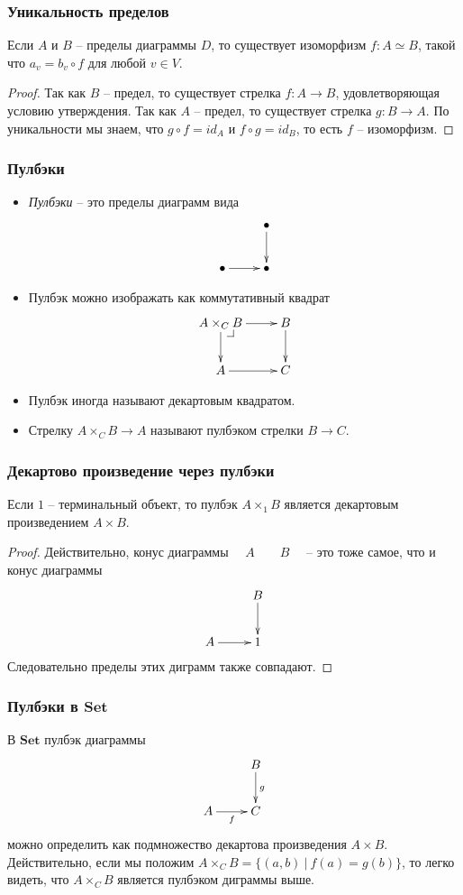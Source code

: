 \documentclass{beamer}
\makeatletter
\theoremstyle{definition}
\newcommand{\cat}[1]{\mathbf{#1}}
\newcommand{\Set}{\cat{Set}}
\newcommand{\pb}[1][dr]{\save*!/#1-1.2pc/#1:(-1,1)@^{|-}\restore}
\makeatother
\begin{document}
\begin{frame}
\frametitle{Уникальность пределов}
\begin{prop}
Если $A$ и $B$ -- пределы диаграммы $D$, то существует изоморфизм $f : A \simeq B$, такой что $a_v = b_v \circ f$ для любой $v \in V$.
\end{prop}
\begin{proof}
Так как $B$ -- предел, то существует стрелка $f : A \to B$, удовлетворяющая условию утверждения.
Так как $A$ -- предел, то существует стрелка $g : B \to A$.
По уникальности мы знаем, что $g \circ f = id_A$ и $f \circ g = id_B$, то есть $f$ -- изоморфизм.
\end{proof}
\end{frame}

\begin{frame}
\frametitle{Пулбэки}
\begin{itemize}
\item \emph{Пулбэки} -- это пределы диаграмм вида
\[ \xymatrix{                & \bullet \ar[d] \\
              \bullet \ar[r] & \bullet
            } \]
\item Пулбэк можно изображать как коммутативный квадрат
\[ \xymatrix{ A \times_C B \ar[d] \ar[r] \pb & B \ar[d] \\
              A \ar[r]                       & C
            } \]
\item Пулбэк иногда называют декартовым квадратом.
\item Стрелку $A \times_C B \to A$ называют пулбэком стрелки $B \to C$.
\end{itemize}
\end{frame}

\begin{frame}
\frametitle{Декартово произведение через пулбэки}
\begin{prop}
Если $1$ -- терминальный объект, то пулбэк $A \times_1 B$ является декартовым произведением $A \times B$.
\end{prop}
\begin{proof}
Действительно, конус диаграммы $\quad A \qquad B \quad$ -- это тоже самое, что и конус диаграммы 
\[ \xymatrix{          & B \ar[d] \\
              A \ar[r] & 1
            } \]
Следовательно пределы этих диграмм также совпадают.
\end{proof}
\end{frame}

\begin{frame}
\frametitle{Пулбэки в $\Set$}
В $\Set$ пулбэк диаграммы
\[ \xymatrix{          & B \ar[d]^g \\
              A \ar[r]_f & C
            } \]
можно определить как подмножество декартова произведения $A \times B$.
Действительно, если мы положим $A \times_C B = \{ (a, b)\ |\ f(a) = g(b) \}$, то легко видеть, что $A \times_C B$ является пулбэком диграммы выше.
\end{frame}
\end{document}
